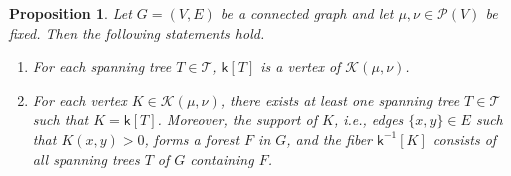 \documentclass[11pt,a4paper]{article}
\newcommand{\prob}{{\mathscr{P}}}
\newcommand{\setoftrees}{{\mathcal{T}}}
\newcommand{\embedding}{{\mathsf{k}}}
\newcommand{\flowpoly}{{\mathcal{K}}}
\newtheorem{proposition}[theorem]{Proposition}
\begin{document}
    \begin{proposition}\label{prop:vertices-of-polytope}
        Let $G=(V,E)$ be a connected graph and let $\mu,\nu\in\prob(V)$ be fixed. Then the following statements hold.
            \begin{enumerate}[label=(\roman*)]
                \item For each spanning tree $T\in\setoftrees$, $\embedding[T]$ is a vertex of $\flowpoly(\mu,\nu)$.
                \item For each vertex $K\in\flowpoly(\mu,\nu)$, there exists at least one spanning tree $T\in\setoftrees$ such that $K = \embedding[T]$. Moreover, the support of $K$, i.e., edges $\{x,y\}\in E$ such that $K(x,y)>0$, forms a forest $F$ in $G$, and the fiber $\embedding^{-1}[K]$ consists of all spanning trees $T$ of $G$ containing $F$.
            \end{enumerate}
    \end{proposition}
\end{document}
